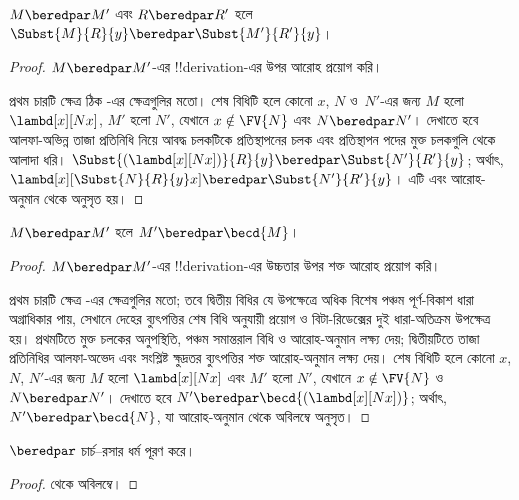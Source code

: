 \documentclass[../../../include/open-logic-section]{subfiles}
\begin{document}
\begin{lem}
  $M \beredpar M'$ এবং $R \beredpar R'$ হলে $\Subst{M}{R}{y}
  \beredpar \Subst{M'}{R'}{y}$।
\end{lem}

\begin{proof}
  $M \beredpar M'$-এর !!{derivation}-এর উপর আরোহ প্রয়োগ করি।

  প্রথম চারটি ক্ষেত্র ঠিক -এর ক্ষেত্রগুলির মতো।
  শেষ বিধিটি  হলে কোনো $x$, $N$ ও~$N'$-এর জন্য
  $M$ হলো $\lambd[x][Nx]$, $M'$ হলো $N'$, যেখানে
  $x \notin \FV{N}$ এবং $N \beredpar N'$। দেখাতে হবে
  আলফা-অভিন্ন তাজা প্রতিনিধি নিয়ে আবদ্ধ চলকটিকে প্রতিস্থাপনের চলক
  এবং প্রতিস্থাপন পদের মুক্ত চলকগুলি থেকে আলাদা ধরি।
  $\Subst{(\lambd[x][Nx])}{R}{y} \beredpar \Subst{N'}{R'}{y}$; অর্থাৎ,
  $\lambd[x][\Subst{N}{R}{y} x] \beredpar \Subst{N'}{R'}{y}$। এটি
   এবং আরোহ-অনুমান থেকে
  অনুসৃত হয়।
\end{proof}

\begin{lem}
  $M \beredpar M'$ হলে $M' \beredpar \becd{M}$।
\end{lem}

\begin{proof}
  $M \beredpar M'$-এর !!{derivation}-এর উচ্চতার উপর শক্ত আরোহ প্রয়োগ
  করি।

  প্রথম চারটি ক্ষেত্র -এর ক্ষেত্রগুলির মতো; তবে
  দ্বিতীয় বিধির যে উপক্ষেত্রে অধিক বিশেষ পঞ্চম পূর্ণ-বিকাশ ধারা
  অগ্রাধিকার পায়, সেখানে দেহের ব্যুৎপত্তির শেষ বিধি অনুযায়ী প্রয়োগ
  ও বিটা-রিডেক্সের দুই ধারা-অতিক্রম উপক্ষেত্র হয়। প্রথমটিতে মুক্ত চলকের
  অনুপস্থিতি, পঞ্চম সমান্তরাল বিধি ও আরোহ-অনুমান লক্ষ্য দেয়; দ্বিতীয়টিতে
  তাজা প্রতিনিধির আলফা-অভেদ এবং সংশ্লিষ্ট ক্ষুদ্রতর ব্যুৎপত্তির শক্ত
  আরোহ-অনুমান লক্ষ্য দেয়।
  শেষ বিধিটি  হলে কোনো $x$, $N$, $N'$-এর জন্য
  $M$ হলো $\lambd[x][Nx]$ এবং $M'$ হলো $N'$, যেখানে
  $x \notin \FV{N}$ ও~$N \beredpar N'$। দেখাতে হবে
  $N' \beredpar \becd{(\lambd[x][Nx])}$; অর্থাৎ,
  $N' \beredpar \becd{N}$, যা আরোহ-অনুমান থেকে অবিলম্বে অনুসৃত।
\end{proof}

\begin{thm}
  $\beredpar$ চার্চ--রসার ধর্ম পূরণ করে।
\end{thm}

\begin{proof}
   থেকে অবিলম্বে।
\end{proof}
\end{document}

